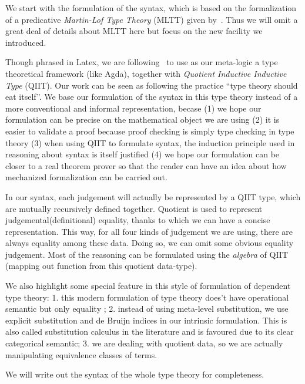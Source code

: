 
We start with the formulation of the syntax, which is based on the
formalization of a predicative \textit{Martin-Lof Type Theory} (MLTT)
given by~\citet{coquand2018canonicity}. Thus we will omit a great deal
of details about MLTT here but focus on the new facility we introduced. 

Though phrased in Latex, we are following~\citet{altkap2016} to use as
our meta-logic a type theoretical framework (like Agda), 
together with \textit{Quotient Inductive Inductive Type} (QIIT). Our work can be seen as following the practice ``type theory should eat itself''\cite{dybjer1995internal, chapman2009type}. We base our formulation of the syntax in this type theory instead of a more conventional and informal representation, becase (1) we hope our formulation can be precise on the mathematical object we are using (2) it is easier to validate a proof because proof checking is simply type checking in type theory (3) when using QIIT to formulate syntax, the induction principle used in reasoning about syntax is itself justified (4) we hope our formulation can be closer to a real theorem prover so that the reader can have an idea about how mechanized formalization can be carried out.

In our syntax, each judgement will actually be represented by a QIIT type, which are
mutually recursively defined together. Quotient is used to represent
judgemental(definitional) equality, thanks to which we can have a
concise representation. This way, for all four kinds of judgement we are
using, there are always equality among these data. Doing so, we can omit
some obvious equality judgement. Most of the reasoning can be formulated
using the \textit{algebra} of QIIT (mapping out function from this
quotient data-type). 

We also highlight some special feature in this style of formulation of dependent type theory: 1. this modern formulation of type theory does't have operational semantic but only equality 
;
2. instead of using meta-level substitution, we use explicit substitution and de Bruijn indices in our intrinsic formulation. This is also called substitution calculus in the literature and is favoured due to its clear categorical semantic; 
3. we are dealing with quotient data, so we are actually manipulating equivalence classes of terms. 

We will write out the syntax of the whole type theory for completeness.






